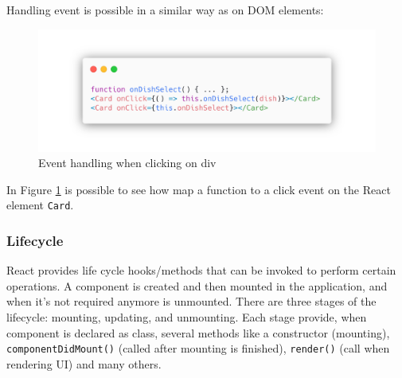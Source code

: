 Handling event is possible in a similar way as on DOM elements:

\begin{figure}[h]
    \includegraphics[width=\textwidth]{assets/react-event-handling.png}
    \caption{Event handling when clicking on div}
    \label{fig:event-handling}
\end{figure}

In Figure \ref{fig:event-handling} is possible to see how map a function to a click event on the React element \texttt{Card}.

\subsubsection*{Lifecycle}
React provides life cycle hooks/methods that can be invoked to perform certain operations. A component is created and then mounted in the application, and when it's not required anymore is unmounted. There are three stages of the lifecycle: mounting, updating, and unmounting. Each stage provide, when component is declared as class, several methods like a constructor (mounting), \texttt{componentDidMount()} (called after mounting is finished), \texttt{render()} (call when rendering UI) and many others.

